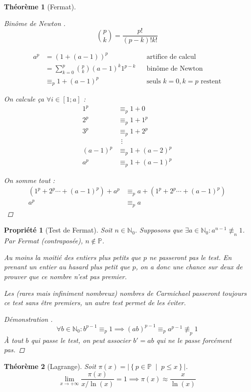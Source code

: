 \documentclass[11pt,twocolumn]{article}
\theoremstyle{plain}
\newtheorem{pr}{Propriété}
\newtheorem{thm}{Théorème}
\newcommand{\esP}{\mathbb{P}} %
\newcommand{\esN}{\mathbb{N}} %
\newenvironment{cproof}[1]{\begin{proof}[Démonstration \cite{#1}]}{\end{proof}}
\begin{document}
\begin{thm}[Fermat]
\begin{proof}[Binôme de Newton \cite{Buys}]
		\[
			\binom p k = \frac{p!}{\left(p-k\right)!k!}
		\]

		\begin{align*}
			a^p
			&= \left(1+\left(a-1\right)\right)^p && \text{artifice de calcul} \\
			&= \sum_{k=0}^p\binom pk(a-1)^k1^{p-k} && \text{binôme de Newton} \\
			&\equiv_p 1 + (a-1)^p && \text{seuls $k=0, k=p$ restent}
		\end{align*}

		On calcule ça $\forall i \in [1;a]$ :
		\begin{align*}
			1^p &\equiv_p 1+0 \\
			2^p &\equiv_p 1+1^p \\
			3^p &\equiv_p 1+2^p \\
			& ~~\vdots \\
			(a-1)^p &\equiv_p 1+(a-2)^p \\
			a^p &\equiv_p 1+(a-1)^p
		\end{align*}

		On somme tout :
		\begin{align*}
			\left(1^p + 2^p \cdots + (a-1)^p\right) + a^p
				&\equiv_p a + \left(1^p + 2^p \cdots + (a-1)^p\right) \\
			a^p &\equiv_p a
		\end{align*}
	\end{proof}
\end{thm}
\begin{pr}[Test de Fermat]
	Soit $n \in \esN_0$.
	Supposons que $\exists a \in \esN_0 : a^{n-1} \not\equiv_n 1$.
	Par Fermat (contraposée), $n \not\in \esP$.

	Au moins la moitié des entiers plus petits que $p$ ne passeront pas le test.
	En prenant un entier au hasard plus petit que $p$, on a donc une chance
	sur deux de prouver que ce nombre n'est pas premier.

	Les (rares mais infiniment nombreux) nombres de Carmichael
	passeront toujours ce test sans être premiers,
	un autre test permet de les éviter.
	\begin{cproof}{Gillis}
		\[
			\forall b \in \esN_0 : b^{p-1}\equiv_p1
			\implies
			(ab)^{p-1} \equiv_p a^{p-1} \not\equiv_p 1
		\]
		À tout $b$ qui passe le test, on peut associer $b'=ab$
		qui ne le passe forcément pas.
	\end{cproof}
\end{pr}
\begin{thm}[Lagrange]
	Soit $\pi(x)=\left|\left\{p\in\esP \; \middle| \; p\leq x \right\}\right|$.
	\[
		\lim_{x\to+\infty}\frac{\pi(x)}{x/\ln(x)}=1
		\implies
		\pi(x) \approx \frac x{\ln(x)}
	\]
\end{thm}
\end{document}
